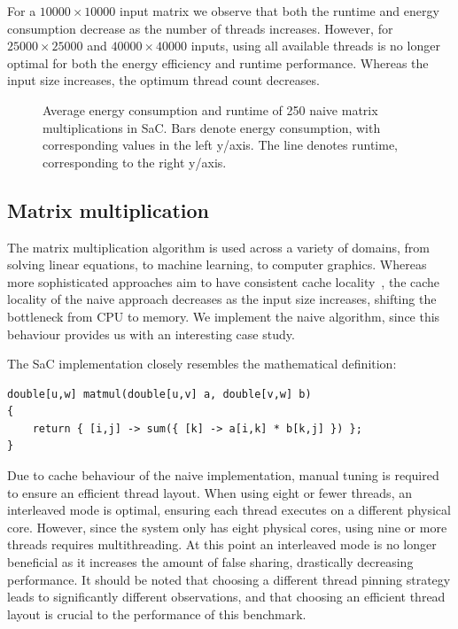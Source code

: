 For a $\num{10000} \times \num{10000}$ input matrix we observe that both the runtime and energy consumption decrease as the number of threads increases.
However, for $\num{25000} \times \num{25000}$ and $\num{40000} \times \num{40000}$ inputs, using all available threads is no longer optimal for both the energy efficiency and runtime performance.
Whereas the input size increases, the optimum thread count decreases.

\begin{figure}[ht]
  \scriptsize
  \begin{subfigure}{0.33\linewidth}
    \centering
  \end{subfigure}%
  \hfill
  \begin{subfigure}{0.33\linewidth}
    \centering
  \end{subfigure}%
  \hfill
  \begin{subfigure}{0.33\linewidth}
    \centering
  \end{subfigure}%
  \caption{Average energy consumption and runtime of 250 naive matrix multiplications in SaC.
  Bars denote energy consumption, with corresponding values in the left y\-/axis.
  The line denotes runtime, corresponding to the right y\-/axis.}%
  \label{fig:matmul}
\end{figure}

\subsection{Matrix multiplication}
The matrix multiplication algorithm is used across a variety of domains, from solving linear equations, to machine learning, to computer graphics.
Whereas more sophisticated approaches aim to have consistent cache locality~\cite{sinkarovs2023rank}, the cache locality of the naive approach decreases as the input size increases, shifting the bottleneck from CPU to memory.
We implement the naive algorithm, since this behaviour provides us with an interesting case study.

The SaC implementation closely resembles the mathematical definition:
\begin{verbatim}
double[u,w] matmul(double[u,v] a, double[v,w] b)
{
    return { [i,j] -> sum({ [k] -> a[i,k] * b[k,j] }) };
}
\end{verbatim}

Due to cache behaviour of the naive implementation, manual tuning is required to ensure an efficient thread layout.
When using eight or fewer threads, an interleaved mode is optimal, ensuring each thread executes on a different physical core.
However, since the system only has eight physical cores, using nine or more threads requires multithreading.
At this point an interleaved mode is no longer beneficial as it increases the amount of false sharing, drastically decreasing performance.
It should be noted that choosing a different thread pinning strategy leads to significantly different observations, and that choosing an efficient thread layout is crucial to the performance of this benchmark.

